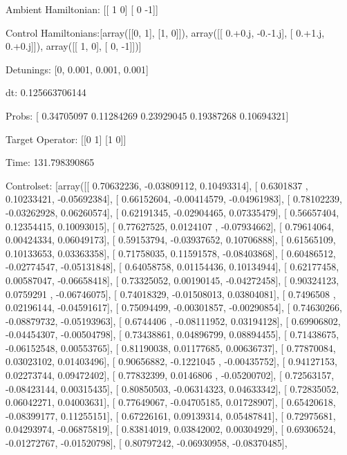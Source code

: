 \documentclass{article}
\begin{document}
    

\newpage

Ambient Hamiltonian: [[ 1  0]
 [ 0 -1]]

Control Hamiltonians:[array([[0, 1],
       [1, 0]]), array([[ 0.+0.j, -0.-1.j],
       [ 0.+1.j,  0.+0.j]]), array([[ 1,  0],
       [ 0, -1]])]

Detunings: [0, 0.001, 0.001, 0.001]

 dt: 0.125663706144

Probs: [ 0.34705097  0.11284269  0.23929045  0.19387268  0.10694321]

Target Operator: [[0 1]
 [1 0]]

Time: 131.798390865

Controlset: [array([[ 0.70632236, -0.03809112,  0.10493314],
       [ 0.6301837 ,  0.10233421, -0.05692384],
       [ 0.66152604, -0.00414579, -0.04961983],
       [ 0.78102239, -0.03262928,  0.06260574],
       [ 0.62191345, -0.02904465,  0.07335479],
       [ 0.56657404,  0.12354415,  0.10093015],
       [ 0.77627525,  0.0124107 , -0.07934662],
       [ 0.79614064,  0.00424334,  0.06049173],
       [ 0.59153794, -0.03937652,  0.10706888],
       [ 0.61565109,  0.10133653,  0.03363358],
       [ 0.71758035,  0.11591578, -0.08403868],
       [ 0.60486512, -0.02774547, -0.05131848],
       [ 0.64058758,  0.01154436,  0.10134944],
       [ 0.62177458,  0.00587047, -0.06658418],
       [ 0.73325052,  0.00190145, -0.04272458],
       [ 0.90324123,  0.0759291 , -0.06746075],
       [ 0.74018329, -0.01508013,  0.03804081],
       [ 0.7496508 ,  0.02196144, -0.04591617],
       [ 0.75094499, -0.00301857, -0.00290854],
       [ 0.74630266, -0.08879732, -0.05193963],
       [ 0.6744406 , -0.08111952,  0.03194128],
       [ 0.69906802, -0.04454307, -0.00504798],
       [ 0.73438861,  0.04896799,  0.08894455],
       [ 0.71438675, -0.06152548,  0.00553765],
       [ 0.81190038,  0.01177685,  0.00636737],
       [ 0.77870084,  0.03023102,  0.01403496],
       [ 0.90656882, -0.1221045 , -0.00435752],
       [ 0.94127153,  0.02273744,  0.09472402],
       [ 0.77832399,  0.0146806 , -0.05200702],
       [ 0.72563157, -0.08423144,  0.00315435],
       [ 0.80850503, -0.06314323,  0.04633342],
       [ 0.72835052,  0.06042271,  0.04003631],
       [ 0.77649067, -0.04705185,  0.01728907],
       [ 0.65420618, -0.08399177,  0.11255151],
       [ 0.67226161,  0.09139314,  0.05487841],
       [ 0.72975681,  0.04293974, -0.06875819],
       [ 0.83814019,  0.03842002,  0.00304929],
       [ 0.69306524, -0.01272767, -0.01520798],
       [ 0.80797242, -0.06930958, -0.08370485],
\end{document}

